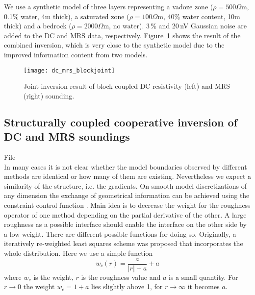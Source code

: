 We use a synthetic model of three layers representing a vadoze zone ($\rho=500\Omega$m, 0.1\% water, 4m thick), a saturated zone ($\rho=100\Omega$m, 40\% water content, 10m thick) and a bedrock ($\rho=2000\Omega$m, no water).
3\,\% and 20\,nV Gaussian noise are added to the DC and MRS data, respectively.
Figure~\ref{fig:blockjoint} shows the result of the combined inversion, which is very close to the synthetic model due to the improved information content from two models.

\begin{figure}[htb]
\centering\texttt{[image: dc\_mrs\_blockjoint]}
\caption{Joint inversion result of block-coupled DC resistivity (left) and MRS (right) sounding.}\label{fig:blockjoint}
\end{figure}


\subsection{Structurally coupled cooperative inversion of DC and MRS soundings}\label{sec:structjoint}
File \\
In many cases it is not clear whether the model boundaries observed by different methods are identical or how many of them are existing.
Nevertheless we expect a similarity of the structure, i.e. the gradients.
On smooth model discretizations of any dimension the exchange of geometrical information can be achieved using the constraint control function \citep{guerue06nearsurface}.
Main idea is to decrease the weight for the roughness operator of one method depending on the partial derivative of the other.
A large roughness as a possible interface should enable the interface on the other side by a low weight.
There are different possible functions for doing so.
Originally, a iteratively re-weighted least squares scheme was proposed that incorporates the whole distribution.
Here we use a simple function
\begin{equation}
    w_c(r) = \frac{a}{|r|+a}+a
\end{equation}
where $w_c$ is the weight, $r$ is the roughness value and $a$ is a small quantity.
For $r\rightarrow 0$ the weight $w_c=1+a$ lies slightly above 1, for $r\rightarrow\infty$ it becomes $a$.

